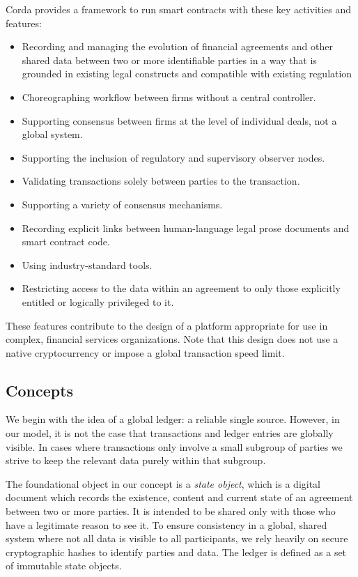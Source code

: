 \documentclass{article}
\begin{document}
Corda provides a framework to run smart contracts with these key activities and features:
\begin{itemize}
    \item{Recording and managing the evolution of financial agreements and other shared data between two or more identifiable parties in a way that is grounded in existing legal constructs and compatible with existing regulation}
    \item{Choreographing workflow between firms without a central controller.}
    \item{Supporting consensus between firms at the level of individual deals, not a global system.}
    \item{Supporting the inclusion of regulatory and supervisory observer nodes.}
    \item{Validating transactions solely between parties to the transaction.}
    \item{Supporting a variety of consensus mechanisms.}
    \item{Recording explicit links between human-language legal prose documents and smart contract code.}
    \item{Using industry-standard tools.}
    \item{Restricting access to the data within an agreement to only those explicitly entitled or logically privileged to it.}
\end{itemize}
These features contribute to the design of a platform appropriate for use in complex, financial services organizations. Note that this design does not use a native cryptocurrency or impose a global transaction speed limit.

\subsection{Concepts}
We begin with the idea of a global ledger: a reliable single source. However, in our model, it is not the case that transactions and ledger entries are globally visible. In cases where transactions only involve a small subgroup of parties we strive to keep the relevant data purely within that subgroup. 

The foundational object in our concept is a \textit{state object}, which is a digital document which records the existence, content and current state of an agreement between two or more parties. It is intended to be shared only with those who have a legitimate reason to see it. To ensure consistency in a global, shared system where not all data is visible to all participants, we rely heavily on secure cryptographic hashes to identify parties and data. The ledger is defined as a set of immutable state objects.
\end{document}
